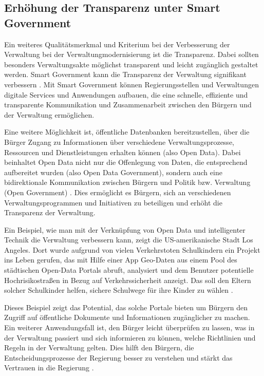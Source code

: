 \subsection{Erhöhung der Transparenz unter Smart Government}
Ein weiteres Qualitätsmerkmal und Kriterium bei der Verbesserung der Verwaltung bei der Verwaltungmodernisierung ist die Transparenz.
Dabei sollten besonders Verwaltungsakte möglichst transparent und leicht zugänglich gestaltet werden.
Smart Government kann die Transparenz der Verwaltung signifikant verbessern \citep[Vgl.][S.87]{Kersting2017}.
Mit Smart Government können Regierungsstellen und Verwaltungen digitale Services und Anwendungen aufbauen, die eine schnelle, effiziente und transparente Kommunikation und Zusammenarbeit zwischen den Bürgern und der Verwaltung ermöglichen. 
\par
Eine weitere Möglichkeit ist, öffentliche Datenbanken bereitzustellen, über die Bürger Zugang zu Informationen über verschiedene Verwaltungsprozesse, Ressourcen und Dienstleistungen erhalten können (also Open Data).
Dabei \glqq{}beinhaltet Open Data nicht nur die Offenlegung von Daten, die entsprechend aufbereitet wurden (also Open Data Government), sondern auch eine bidirektionale Kommunikation zwischen Bürgern und Politik bzw. Verwaltung (Open Government)\grqq{} \citep[Vgl.][S.94]{Kersting2017}.
Dies ermöglicht es Bürgern, sich an verschiedenen Verwaltungsprogrammen und Initiativen zu beteiligen und erhöht die Transparenz der Verwaltung.
\par
\label{LAVerkehr}
Ein Beispiel, wie man mit der Verknüpfung von Open Data und intelligenter Technik die Verwaltung verbessern kann, zeigt die US-amerikanische Stadt Los Angeles.
Dort wurde aufgrund von vielen Verkehrstoten Schulkindern ein Projekt ins Leben gerufen, das mit Hilfe einer App Geo-Daten aus einem Pool des städtischen Open-Data Portals abruft, analysiert und dem Benutzer potentielle Hochrisikostraßen in Bezug auf Verkehrssicherheit anzeigt.
Das soll den Eltern solcher Schulkinder helfen, sichere Schulwege für ihre Kinder zu wählen \citep[][]{LAVisionZero2023}.
\par
Dieses Beispiel zeigt das Potential, das solche Portale bieten um Bürgern den Zugriff auf öffentliche Dokumente und Informationen zugänglicher zu machen.
Ein weiterer Anwendungsfall ist, den Bürger leicht überprüfen zu lassen, was in der Verwaltung passiert und sich informieren zu können, welche Richtlinien und Regeln in der Verwaltung gelten. 
Dies hilft den Bürgern, die Entscheidungsprozesse der Regierung besser zu verstehen und stärkt das Vertrauen in die Regierung \citep[Vgl.][S.94]{Kersting2017}.
